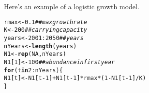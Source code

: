 \documentclass[12pt]{article}\usepackage[]{graphicx}\usepackage[]{color}
\makeatletter
\newcommand{\hlnum}[1]{\textcolor[rgb]{0.686,0.059,0.569}{#1}}%
\newcommand{\hlcom}[1]{\textcolor[rgb]{0.678,0.584,0.686}{\textit{#1}}}%
\newcommand{\hlopt}[1]{\textcolor[rgb]{0,0,0}{#1}}%
\newcommand{\hlstd}[1]{\textcolor[rgb]{0.345,0.345,0.345}{#1}}%
\newcommand{\hlkwa}[1]{\textcolor[rgb]{0.161,0.373,0.58}{\textbf{#1}}}%
\newcommand{\hlkwb}[1]{\textcolor[rgb]{0.69,0.353,0.396}{#1}}%
\newcommand{\hlkwd}[1]{\textcolor[rgb]{0.737,0.353,0.396}{\textbf{#1}}}%
\newenvironment{kframe}{%
 \def\at@end@of@kframe{}%
 \ifinner\ifhmode%
  \def\at@end@of@kframe{\end{minipage}}%
  \begin{minipage}{\columnwidth}%
 \fi\fi%
 \def\FrameCommand##1{\hskip\@totalleftmargin \hskip-\fboxsep
 \colorbox{shadecolor}{##1}\hskip-\fboxsep
     \hskip-\linewidth \hskip-\@totalleftmargin \hskip\columnwidth}%
 \MakeFramed {\advance\hsize-\width
   \@totalleftmargin\z@ \linewidth\hsize
   \@setminipage}}%
 {\par\unskip\endMakeFramed%
 \at@end@of@kframe}
\newenvironment{knitrout}{}{} %
\makeatother
\begin{document}
Here's an example of a logistic growth model.
\begin{knitrout}\small
{}\color{fgcolor}\begin{kframe}
\begin{alltt}
\hlstd{rmax} \hlkwb{<-} \hlnum{0.1}              \hlcom{## max growth rate}
\hlstd{K} \hlkwb{<-} \hlnum{200}                 \hlcom{## carrying capacity}
\hlstd{years} \hlkwb{<-} \hlnum{2001}\hlopt{:}\hlnum{2050}       \hlcom{## years}
\hlstd{nYears} \hlkwb{<-} \hlkwd{length}\hlstd{(years)}
\hlstd{N1} \hlkwb{<-} \hlkwd{rep}\hlstd{(}\hlnum{NA}\hlstd{, nYears)}
\hlstd{N1[}\hlnum{1}\hlstd{]} \hlkwb{<-} \hlnum{100}             \hlcom{## abundance in first year}
\hlkwa{for}\hlstd{(t} \hlkwa{in} \hlnum{2}\hlopt{:}\hlstd{nYears) \{}
    \hlstd{N1[t]} \hlkwb{<-} \hlstd{N1[t}\hlopt{-}\hlnum{1}\hlstd{]} \hlopt{+} \hlstd{N1[t}\hlopt{-}\hlnum{1}\hlstd{]}\hlopt{*}\hlstd{rmax}\hlopt{*}\hlstd{(}\hlnum{1} \hlopt{-} \hlstd{N1[t}\hlopt{-}\hlnum{1}\hlstd{]}\hlopt{/}\hlstd{K)}
\hlstd{\}}
\end{alltt}
\end{kframe}
\end{knitrout}



\end{document}
